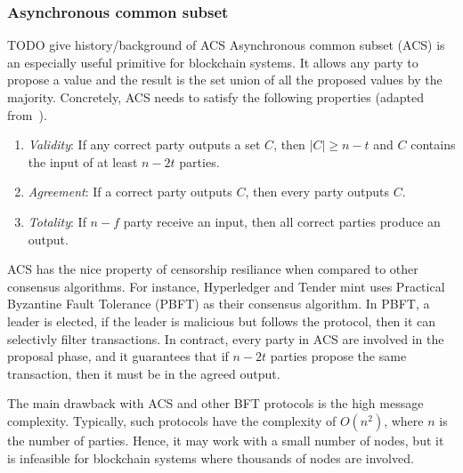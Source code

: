 \subsubsection*{Asynchronous common subset}
TODO give history/background of ACS
Asynchronous common subset (ACS) is an especially useful primitive for blockchain systems.
It allows any party to propose a value and the result is the set union of all the proposed values by the majority.
Concretely, ACS needs to satisfy the following properties (adapted from~\cite{miller2016honey}).
\begin{enumerate}
    \item \emph{Validity}:
        If any correct party outputs a set $C$,
        then $|C| \ge n - t$ and $C$ contains the input of at least $n - 2t$ parties.
    \item \emph{Agreement}:
        If a correct party outputs $C$, then every party outputs $C$.
    \item \emph{Totality}:
        If $n - f$ party receive an input, then all correct parties produce an output.
\end{enumerate}

ACS has the nice property of censorship resiliance when compared to other consensus algorithms.
For instance, Hyperledger and Tender mint uses Practical Byzantine Fault Tolerance (PBFT) as their consensus algorithm.
In PBFT, a leader is elected, if the leader is malicious but follows the protocol, then it can selectivly filter transactions.
In contract, every party in ACS are involved in the proposal phase,
and it guarantees that if $n - 2t$ parties propose the same transaction, then it must be in the agreed output.

The main drawback with ACS and other BFT protocols is the high message complexity.
Typically, such protocols have the complexity of $O(n^2)$, where $n$ is the number of parties.
Hence, it may work with a small number of nodes,
but it is infeasible for blockchain systems where thousands of nodes are involved.




